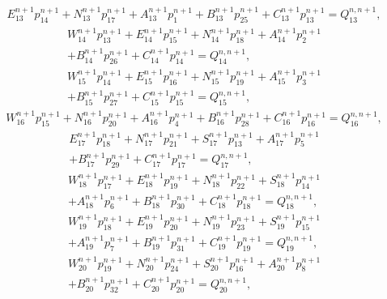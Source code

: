 \begin{multline}
\label{solution14}
E^{n+1}_{13}p^{n+1}_{14}+N^{n+1}_{13}p^{n+1}_{17}+A^{n+1}_{13}p^{n+1}_{1}+B^{n+1}_{13}p^{n+1}_{25}+C^{n+1}_{13}p^{n+1}_{13}=Q^{n, n+1}_{13},
\end{multline}
\begin{multline}
\label{solution15}
W^{n+1}_{14}p^{n+1}_{13}+E^{n+1}_{14}p^{n+1}_{15}+N^{n+1}_{14}p^{n+1}_{18}+A^{n+1}_{14}p^{n+1}_{2}\\+B^{n+1}_{14}p^{n+1}_{26}+C^{n+1}_{14}p^{n+1}_{14}=Q^{n, n+1}_{14},
\end{multline}
\begin{multline}
\label{solution16}
W^{n+1}_{15}p^{n+1}_{14}+E^{n+1}_{15}p^{n+1}_{16}+N^{n+1}_{15}p^{n+1}_{19}+A^{n+1}_{15}p^{n+1}_{3}\\+B^{n+1}_{15}p^{n+1}_{27}+C^{n+1}_{15}p^{n+1}_{15}=Q^{n, n+1}_{15},
\end{multline}
\begin{multline}
\label{solution17}
W^{n+1}_{16}p^{n+1}_{15}+N^{n+1}_{16}p^{n+1}_{20}+A^{n+1}_{16}p^{n+1}_{4}+B^{n+1}_{16}p^{n+1}_{28}+C^{n+1}_{16}p^{n+1}_{16}=Q^{n, n+1}_{16},
\end{multline}
\begin{multline}
\label{solution18}
E^{n+1}_{17}p^{n+1}_{18}+N^{n+1}_{17}p^{n+1}_{21}+S^{n+1}_{17}p^{n+1}_{13}+A^{n+1}_{17}p^{n+1}_{5}\\+B^{n+1}_{17}p^{n+1}_{29}+C^{n+1}_{17}p^{n+1}_{17}=Q^{n, n+1}_{17},
\end{multline}
\begin{multline}
\label{solution19}
W^{n+1}_{18}p^{n+1}_{17}+E^{n+1}_{18}p^{n+1}_{19}+N^{n+1}_{18}p^{n+1}_{22}+S^{n+1}_{18}p^{n+1}_{14}\\+A^{n+1}_{18}p^{n+1}_{6}+B^{n+1}_{18}p^{n+1}_{30}+C^{n+1}_{18}p^{n+1}_{18}=Q^{n, n+1}_{18},
\end{multline}
\begin{multline}
\label{solution20}
W^{n+1}_{19}p^{n+1}_{18}+E^{n+1}_{19}p^{n+1}_{20}+N^{n+1}_{19}p^{n+1}_{23}+S^{n+1}_{19}p^{n+1}_{15}\\+A^{n+1}_{19}p^{n+1}_{7}+B^{n+1}_{19}p^{n+1}_{31}+C^{n+1}_{19}p^{n+1}_{19}=Q^{n, n+1}_{19},
\end{multline}
\begin{multline}
\label{solution21}
W^{n+1}_{20}p^{n+1}_{19}+N^{n+1}_{20}p^{n+1}_{24}+S^{n+1}_{20}p^{n+1}_{16}+A^{n+1}_{20}p^{n+1}_{8}\\+B^{n+1}_{20}p^{n+1}_{32}+C^{n+1}_{20}p^{n+1}_{20}=Q^{n, n+1}_{20},
\end{multline}
